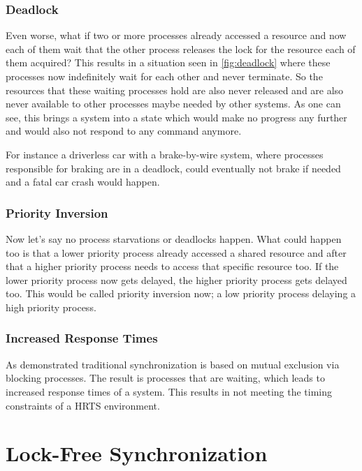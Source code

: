 \subsubsection{Deadlock}\label{subsubsec:deadlock}

Even worse, what if two or more processes already accessed a resource and now each of them wait that the other process releases the lock for the resource each of them acquired? This results in a situation seen in \cref{fig:deadlock} where these processes now indefinitely wait for each other and never terminate. So the resources that these waiting processes hold are also never released and are also never available to other processes maybe needed by other systems. As one can see, this brings a system into a state which would make no progress any further and would also not respond to any command anymore. \cite{Deadlock,chahar2013deadlock}

For instance a driverless car with a brake-by-wire system, where processes responsible for braking are in a deadlock, could eventually not brake if needed and a fatal car crash would happen. 


\subsubsection{Priority Inversion}\label{subsubsec:priority-inversion}

Now let's say no process starvations or deadlocks happen. What could happen too is that a lower priority process already accessed a shared resource and after that a higher priority process needs to access that specific resource too. If the lower priority process now gets delayed, the higher priority process gets delayed too. This would be called priority inversion now; a low priority process delaying a high priority process. \cite{priorityInversion}

\subsubsection{Increased Response Times}\label{subsubsec:increased-response-times}

As demonstrated traditional synchronization is based on mutual exclusion via blocking processes. The result is processes that are waiting, which leads to increased response times of a system. This results in not meeting the timing constraints of a \ac{HRTS} environment.

\section{Lock-Free Synchronization}\label{sec:lock-free}

